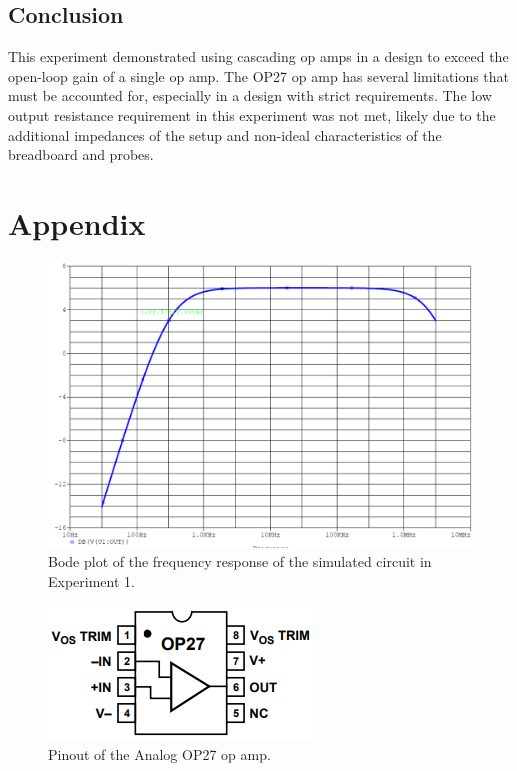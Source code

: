 \documentclass{report}
\begin{document}
	\subsection{Conclusion}
	This experiment demonstrated using cascading op amps in a design to exceed the open-loop gain of a single op amp. The OP27 op amp has several limitations that must be accounted for, especially in a design with strict requirements. The low output resistance requirement in this experiment was not met, likely due to the additional impedances of the setup and non-ideal characteristics of the breadboard and probes.
	
	 
	\pagebreak
	
	\section*{Appendix}
	\begin{figure}[h]
		\centering
		\includegraphics[width=\linewidth]{exp1simscreenshot}
		\caption{Bode plot of the frequency response of the simulated circuit in Experiment 1.}
		\label{fig:exp1simscreenshot}
	\end{figure}

	\begin{figure}[h]
		\centering
		\includegraphics[width=0.4\linewidth]{exp1pinout}
		\caption{Pinout of the Analog OP27 op amp.}
		\label{fig:exp1pinout}
	\end{figure}
\end{document}
